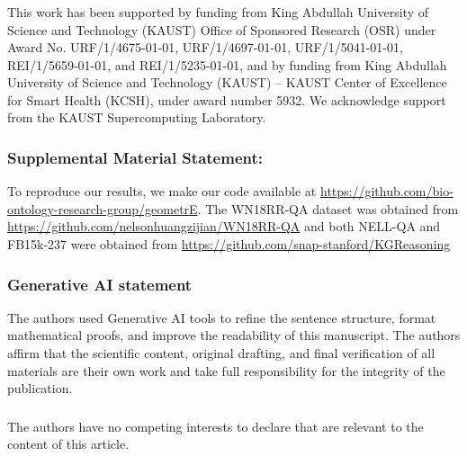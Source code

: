 \documentclass[runningheads]{llncs}
\begin{document}
\begin{credits}

\subsubsection{\ackname}
This work has been supported by funding from King Abdullah University
of Science and Technology (KAUST) Office of Sponsored Research (OSR)
under Award No. URF/1/4675-01-01, URF/1/4697-01-01, URF/1/5041-01-01,
REI/1/5659-01-01, and REI/1/5235-01-01, and by funding from King
Abdullah University of Science and Technology (KAUST) -- KAUST Center
of Excellence for Smart Health (KCSH), under award number 5932.  We
acknowledge support from the KAUST Supercomputing Laboratory.


\subsubsection{Supplemental Material Statement:}

To reproduce our results, we make our code available at
\url{https://github.com/bio-ontology-research-group/geometrE}. The WN18RR-QA
dataset was obtained from
\url{https://github.com/nelsonhuangzijian/WN18RR-QA} and both NELL-QA
and FB15k-237 were obtained from
\url{https://github.com/snap-stanford/KGReasoning}


  


  
\subsubsection{Generative AI statement}

The authors used Generative AI tools to refine the sentence structure,
format mathematical proofs, and improve the readability of this
manuscript. The authors affirm that the scientific content, original
drafting, and final verification of all materials are their own work
and take full responsibility for the integrity of the publication.


\subsubsection{\discintname}
The authors have no competing interests to declare that are relevant
to the content of this article.
\end{credits}
%
%
%


%
\end{document}
